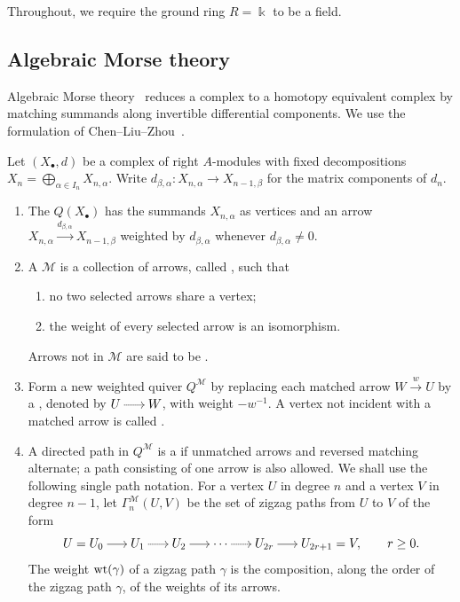 \documentclass[a4paper,leqno]{amsart}
\begin{document}
Throughout, we require the ground ring $R=\Bbbk$ to be a field.

\subsection{Algebraic Morse theory}
\label{subsec:algebraic-morse}

Algebraic Morse theory~\cite{Sko06,JW09} reduces a complex to a homotopy equivalent complex by matching summands along invertible differential components. We use the formulation of Chen--Liu--Zhou~\cite[Section~3]{CLZ26}.


\begin{dfn}\label{dfn:morse-matching}
Let $(X_\bullet,d)$ be a complex of right $A$-modules with fixed decompositions $X_n=\bigoplus_{\alpha\in I_n}X_{n,\alpha}$. Write $d_{\beta,\alpha}\colon X_{n,\alpha}\to X_{n-1,\beta}$ for the matrix components of $d_n$.
\begin{enumerate}
\item The  $Q(X_\bullet)$ has the summands $X_{n,\alpha}$ as vertices and an arrow $X_{n,\alpha}\xrightarrow{d_{\beta,\alpha}}X_{n-1,\beta}$ weighted by $d_{\beta,\alpha}$ whenever $d_{\beta,\alpha}\neq0$.

\item A  $\mathcal M$ is a collection of arrows, called , such that
\begin{enumerate}
\item no two selected arrows share a vertex;
\item the weight of every selected arrow is an isomorphism.
\end{enumerate}
Arrows not in $\mathcal M$ are said to be .

\item Form a new weighted quiver $Q^{\mathcal M}$ by
replacing each matched arrow $W\xrightarrow{w}U$ by a , denoted by $U\morsedottedarrow W$, with weight $-w^{-1}$.
A vertex not incident with a matched arrow is called .

\item A directed path in $Q^{\mathcal M}$ is a  if unmatched arrows and reversed matching alternate; a path consisting of one arrow is also allowed.  We shall use the following single path notation.  For a vertex $U$ in degree $n$ and a vertex $V$ in degree $n-1$, let $\Gamma_n^{\mathcal M}(U,V)$ be the set of zigzag paths from $U$ to $V$ of the form
\[
 U=U_0\morsethickarrow U_1
 \morsedottedarrow U_2
 \morsethickarrow\cdots
 \morsedottedarrow U_{2r}
 \morsethickarrow U_{2r+1}=V,
 \qquad r\geq0.
\]
The weight $\operatorname{wt}(\gamma)$ of a zigzag path $\gamma$ is the composition, along the order of the zigzag path $\gamma$, of the weights of its arrows.


\end{enumerate}
\end{dfn}
\end{document}
